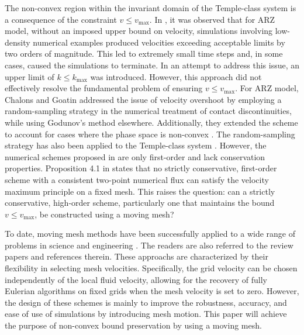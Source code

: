 \documentclass[times,final,11pt]{elsarticle}
\numberwithin{equation}{section}
\theoremstyle{definition}
\theoremstyle{remark}
\begin{document}
The non-convex region within the invariant domain of the Temple-class system is a consequence of the constraint $v \leq v_{\max}$. In \cite{CHEN20251135007}, it was observed that for ARZ model, without an imposed upper bound on velocity, simulations involving low-density numerical examples produced velocities exceeding acceptable limits by two orders of magnitude. This led to extremely small time steps and, in some cases, caused the simulations to terminate. In an attempt to address this issue, an upper limit of $k \leq k_{\max}$ was introduced. However, this approach did not effectively resolve the fundamental problem of ensuring $v \leq v_{\max}$. 
For ARZ model, Chalons and Goatin \cite{chalons2007transport} addressed the issue of velocity overshoot by employing a random-sampling strategy in the numerical treatment of contact discontinuities, while using Godunov’s method elsewhere. 
Additionally, they extended the scheme to account for cases where the phase space is non-convex \cite{chalons2008godunov}. 
The random-sampling strategy has also been applied to the Temple-class system \cite{betancourt2018random}. 
However, the numerical schemes proposed in \cite{betancourt2018random,chalons2007transport,chalons2008godunov} are only first-order and lack conservation properties. Proposition 4.1 in \cite{betancourt2018random} states that no strictly conservative, first-order scheme with a consistent two-point numerical flux can satisfy the velocity maximum principle on a fixed mesh. This raises the question: can a strictly conservative, high-order scheme, particularly one that maintains the bound $v \leq v_{\max}$, be constructed using a moving mesh?

To date, moving mesh methods have been successfully applied to a wide range of problems in science and engineering \cite{zhang2018adaptive,huang2001variational,NMTMA-16-111,lei2021high,duan2021entropy,barlow2016arbitrary,boscheri2017high}. 
The readers are also referred to the review papers \cite{tang2005moving,budd2009adaptivity,donea2004arbitrary} and references therein.
These approachs are characterized by their flexibility in selecting mesh velocities. 
Specifically, the grid velocity can be chosen independently of the local fluid velocity, allowing for the recovery of fully Eulerian algorithms on fixed grids when the mesh velocity is set to zero. 
However, the design of these schemes is mainly to improve the robustness, accuracy, and ease of use of simulations by introducing mesh motion. 
This paper will achieve the purpose of non-convex bound preservation by using a moving mesh.
\end{document}
